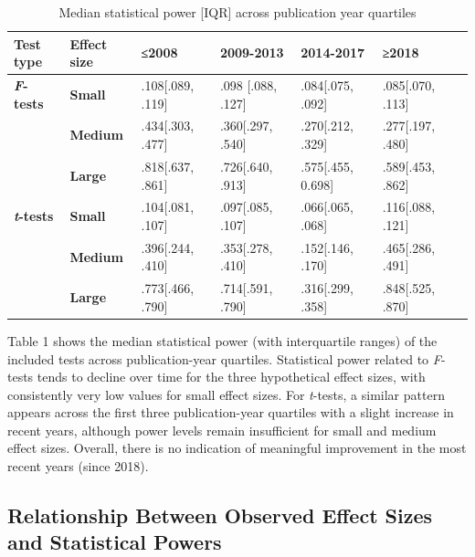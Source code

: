 \documentclass[authordate, meta]{jote-new-article}
\begin{document}
		\begin{table}
        \caption{Median statistical power [IQR] across publication year quartiles}
		\begin{tabularx}{\textwidth}{@{} l l l l l l l @{}}
			\hline \textbf{Test type} & \textbf{Effect size} & \textbf{≤2008} & \textbf{2009-2013}
			& \textbf{2014-2017} & \textbf{≥2018} \\

			\hline \textbf{\emph{F}-tests} & \textbf{Small} & .108[.089, .119] &
			.098 [.088, .127] & .084[.075, .092] & .085[.070, .113] \\

			  & \textbf{Medium} & .434[.303, .477] & .360[.297, .540] & .270[.212, .329]
			& .277[.197, .480] \\

			  & \textbf{Large} & .818[.637, .861] & .726[.640, .913] & .575[.455, 0.698]
			& .589[.453, .862] \\

			\hline \textbf{\emph{t}-tests} & \textbf{Small} & .104[.081, .107] & .097[.085, .107]
			& .066[.065, .068] & .116[.088, .121] \\

			  & \textbf{Medium} & .396[.244, .410] & .353[.278, .410] & .152[.146, .170]
			& .465[.286, .491] \\

			  & \textbf{Large} & .773[.466, .790] & .714[.591, .790] & .316[.299, .358]
			& .848[.525, .870] \\


		\end{tabularx}
	\end{table}

	Table 1 shows the median statistical power (with interquartile ranges) of the included tests across publication-year quartiles. Statistical power related to \emph{F}-tests tends to decline over time for the three hypothetical effect sizes, with consistently very low values for small effect sizes. For \emph{t}-tests, a similar pattern appears across the first three publication-year quartiles with a slight increase in recent years, although power levels remain insufficient for small and medium effect sizes. Overall, there is no indication of meaningful improvement in the most recent years (since 2018).



	\subsection{Relationship Between Observed Effect Sizes and Statistical Powers}
\end{document}
